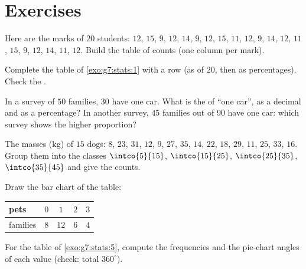 \section{Exercises}

\begin{exercise}[$\star$]\label{exo:g7:stats:1}
Here are the marks of $20$ students: $12$, $15$, $9$, $12$, $14$,
$9$, $12$, $15$, $11$, $12$, $9$, $14$, $12$, $11$, $15$, $9$, $12$,
$14$, $11$, $12$. Build the table of counts (one column per mark).
\end{exercise}

\begin{exercise}[$\star$]\label{exo:g7:stats:2}
Complete the table of \cref{exo:g7:stats:1} with a  row
(as  of $20$, then as percentages). Check the .
\end{exercise}

\begin{exercise}[$\star$]\label{exo:g7:stats:3}
In a survey of $50$ families, $30$ have one car. What is the
 of ``one car'', as a decimal and as a percentage? In another
survey, $45$ families out of $90$ have one car: which survey shows
the higher proportion?
\end{exercise}

\begin{exercise}[$\star$]\label{exo:g7:stats:4}
The masses (kg) of $15$ dogs: $8$, $23$, $31$, $12$, $9$, $27$, $35$,
$14$, $22$, $18$, $29$, $11$, $25$, $33$, $16$. Group them into the
classes $\intco{5}{15}$, $\intco{15}{25}$, $\intco{25}{35}$,
$\intco{35}{45}$ and give the counts.
\end{exercise}

\begin{exercise}[$\star$]\label{exo:g7:stats:5}
Draw the bar chart of the table:
\begin{center}
\renewcommand{\arraystretch}{1.2}
\begin{tabular}{l|cccc}
pets & $0$ & $1$ & $2$ & $3$ \\
\hline
families & $8$ & $12$ & $6$ & $4$ \\
\end{tabular}
\end{center}
\end{exercise}

\begin{exercise}[$\star$]\label{exo:g7:stats:6}
For the table of \cref{exo:g7:stats:5}, compute the frequencies and
the pie-chart angles of each value (check: total $360^\circ$).
\end{exercise}

